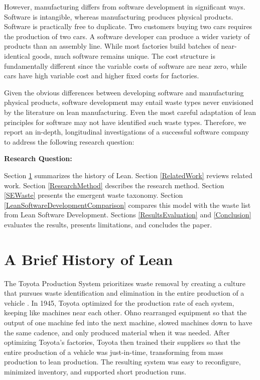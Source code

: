 However, manufacturing differs from software development in significant ways. Software is intangible, whereas manufacturing produces physical products. Software is practically free to duplicate. Two customers buying two cars requires the production of two cars. A software developer can produce a wider variety of products than an assembly line. While most factories build batches of near-identical goods, much software remains unique. The cost structure is fundamentally different since the variable costs of software are near zero, while cars have high variable cost and higher fixed costs for factories. 


Given the obvious differences between developing software and manufacturing physical products, software development may entail waste types never envisioned by the literature on lean manufacturing. Even the most careful adaptation of lean principles for software may not have identified such waste types. Therefore, we report an in-depth, longitudinal investigations of a successful software company to address the following research question: 


\textbf{Research Question: }


Section \ref{HistoryOfLean} summarizes the history of Lean. Section \ref{RelatedWork} reviews related work. Section \ref{ResearchMethod} describes the research method. Section \ref{SEWaste} presents the emergent waste taxonomy. Section \ref{LeanSoftwareDevelopmentComparison} compares this model with the waste list from Lean Software Development. Sections \ref{ResultsEvaluation} and \ref{Conclusion} evaluates the results, presents limitations, and concludes the paper.


\section{A Brief History of Lean}
\label{HistoryOfLean}


The Toyota Production System prioritizes waste removal by creating a culture that pursues waste identification and elimination in the entire production of a vehicle \cite{OhnoToyotaProductionSystem, ShingoToyotaProductionSystem}. In 1945, Toyota optimized for the production rate of each system, keeping like machines near each other. Ohno rearranged equipment so that the output of one machine fed into the next machine, slowed machines down to have the same cadence, and only produced material when it was needed. After optimizing Toyota's factories, Toyota then trained their suppliers so that the entire production of a vehicle was just-in-time, transforming from mass production to lean production. The resulting  system was easy to reconfigure, minimized inventory, and supported short production runs.  


